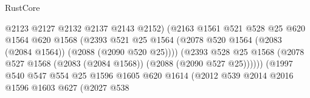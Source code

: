 \begin{lexlean}{RustCore}
\begin{coremodule}
                                            @2123
                                            @2127
                                            @2132
                                            @2137
                                            @2143
                                            @2152)
                                          (@2163
                                            @1561
                                            @521
                                            @528
                                            @25
                                            @620
                                            @1564
                                            @620
                                            @1568
                                            (@2393
                                              @521
                                              @25
                                              @1564
                                              (@2078
                                                @520
                                                @1564
                                                (@2083 (@2084 @1564))
                                                (@2088 (@2090 @520 @25))))
                                            (@2393
                                              @528
                                              @25
                                              @1568
                                              (@2078
                                                @527
                                                @1568
                                                (@2083 (@2084 @1568))
                                                (@2088 (@2090 @527 @25))))))
                                        (@1997
                                          @540
                                          @547
                                          @554
                                          @25
                                          @1596
                                          @1605
                                          @620
                                          @1614
                                          (@2012
                                            @539
                                            @2014
                                            @2016
                                            @1596
                                            @1603
                                            @627
                                            (@2027
                                              @538

\end{coremodule}
\end{lexlean}
